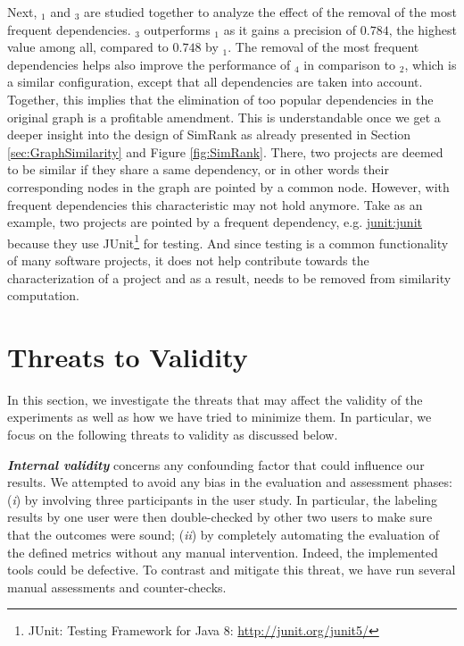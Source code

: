 Next, \CrossSimA$_{1}$ and \CrossSimA$_{3}$ are studied together to analyze the effect of the removal of the most frequent dependencies. \CrossSimA$_{3}$ outperforms \CrossSimA$_{1}$ as it gains a precision of $0.784$, the highest value among all, compared to $0.748$ by \CrossSimA$_{1}$. The removal of the most frequent dependencies helps also improve the performance of \CrossSimA$_{4}$ in comparison to \CrossSimA$_{2}$, which is a similar configuration, except that all dependencies are taken into account. Together, this implies that the elimination of too popular dependencies in the original graph is a profitable amendment. This is understandable once we get a deeper insight into the design of SimRank as already presented in Section \ref{sec:GraphSimilarity} and Figure \ref{fig:SimRank}. There, two projects are deemed to be similar if they share a same dependency, or in other words their corresponding nodes in the graph are pointed by a common node. However, with frequent dependencies this characteristic may not hold anymore. Take as an example, two projects are pointed by a frequent dependency, e.g. \href{https://mvnrepository.com/artifact/junit/junit}{junit:junit} because they use JUnit\footnote{JUnit: Testing Framework for Java 8: \url{http://junit.org/junit5/}} for testing. And since testing is a common functionality of many software projects, it does not help contribute towards the characterization of a project and as a result, needs to be removed from similarity computation. 


\section{Threats to Validity}\label{sec:threatsValidity}

In this section, we investigate the threats that may affect the validity of the experiments as well as how we have tried to minimize them. In particular, we focus on the following threats to validity as discussed below. %

\textit{\textbf{Internal validity}}  concerns any confounding factor that could influence our results.  We attempted to avoid any bias in the evaluation and assessment
phases: (\emph{i}) by involving three participants in the user study. In particular, the labeling results by one user were then double-checked by other two users to make sure that the outcomes were sound; (\emph{ii}) by completely automating the evaluation of the defined metrics without any manual intervention. Indeed, the implemented tools could be defective. To contrast and mitigate this threat, we have run several manual assessments and counter-checks.

